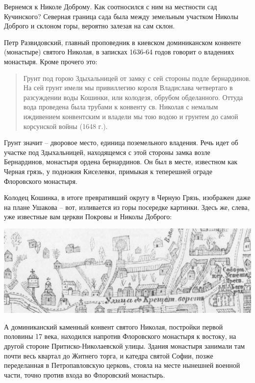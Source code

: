 Вернемся к Николе Доброму. Как соотносился с ним на местности сад Кучинского? Северная граница сада была между земельным участком Николы Доброго и склоном горы, вероятно залезая на сам склон.

Петр Развидовский, главный проповедник в киевском доминиканском конвенте (монастыре) святого Николая, в записках 1636-64 годов говорит о владениях монастыря. Кроме прочего это: 

\begin{quotation}
Грунт под горою Здыхальницей от замку с сей стороны подле бернардинов. На сей грунт имели мы привиллегию короля Владислава четвертаго в разсуждении воды Кошинки, или колодезя, обрубом обделанного. Оттуда вода проведена была трубами к конвенту св. Николая с немалым иждивением конвентским и владели мы тою водою и грунтем до самой корсунской войны (1648 г.).
\end{quotation}

Грунт значит – дворовое место, единица поземельного владения. Речь идет об участке под Здыхальницей, находящемся с этой стороны замка возле Бернардинов, монастыря ордена бернардинов. Он был в месте, известном как Черная грязь, у подножия Киселевки, примыкая к теперешней ограде Флоровского монастыря.

Колодец Кошинка, в итоге превративший округу в Черную Грязь, изображен даже на плане Ушакова – вот, изливается из горы посередке картинки. Здесь же, слева, уже известные вам церкви Покровы и Николы Доброго:

\begin{center}
\includegraphics[width=\linewidth]{chast-colebanie-osnov/borichev-tok/s_koshinka.jpg}
\end{center}

А доминиканский каменный конвент святого Николая, постройки первой половины 17 века, находился напротив Флоровского монастыря к востоку, на другой стороне Притиско-Николаевской улицы. Здания монастыря занимали там почти весь квартал до Житнего торга, и катедра святой Софии, позже переделанная в Петропавловскую церковь, стояла на месте нынешней военной части, точно против входа во Флоровский монастырь.

